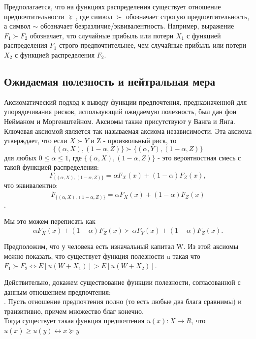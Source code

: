 \documentclass[12pt,a4paper]{article}
\begin{document}
Предполагается, что на функциях распределения существует отношение предпочтительности $ \succeq$,  где символ $\succ$ обозначает строгую предпочтительность, а символ $\sim$ обозначает безразличие/эквивалентность. Например, выражение $F_1 \succ F_2$ обозначает, что случайные прибыль или потери  $X_1$ с функцией распределения $F_1$  строго предпочтительнее, чем случайные прибыль или потери  $X_2$ с функцией распределения $F_2$.\\

\subsection {Ожидаемая полезность и нейтральная мера}
Аксиоматический подход к выводу функции предпочтения, предназначенной для упорядочивания рисков, использующий ожидаемую полезность, был дан фон Нейманом и Моргенштейном. Аксиомы также присутствуют у Ванга и Янга. Ключевая аксиомой является так называемая аксиома независимости. Эта аксиома утверждает, что если $X \succ Y$ и Z - произвольный риск, то
$$\{(\alpha,X),(1-\alpha,Z)\} \succ \{(\alpha,Y),(1-\alpha,Z)\} $$
для любых $0 \leq \alpha \leq 1 $, где $ \{ (\alpha,X),(1-\alpha,Z) \}$ - это вероятностная смесь с такой функцией распределения:
$$F_{  \{(\alpha,X),(1-\alpha,Z)\} } = \alpha F_X(x) + (1-\alpha)F_Z(x),$$
что эквивалентно:
$$\overline F_{  \{(\alpha,X),(1-\alpha,Z)\} } = \alpha {\overline  F}_X(x) + (1-\alpha ){ \overline F} _Z(x)$$.

Мы это можем переписать как 
$$\alpha {\overline  F}_X(x) + (1-\alpha ){ \overline F} _Z(x) \succ \alpha {\overline  F}_Y(x) + (1-\alpha ){ \overline F} _Z(x).$$

Предположим, что у человека есть изначальный капитал W. Из этой аксиомы можно показать, что существует функция полезности u такая что 
$F_1 \succ F_2 \Leftrightarrow  E \left[ u(W + X_1) \right]  >  E \left[u(W + X_2) \right] .$  

Действительно, докажем существование функции полезности, согласованной с данным отношением предпочтения:\\


{\large {}.} Пусть отношение предпочтения полно (то есть любые два блага сравнимы) и транзитивно, причем множество благ конечно. \\
Тогда существует такая функция предпочтения $u(x): X \rightarrow R$, что\\
 $u(x) \geq u(y) \leftrightarrow x \succeq y$
\end{document}
